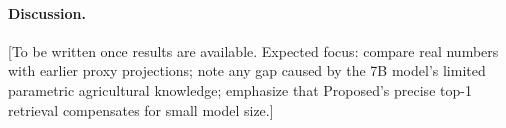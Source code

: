 \paragraph{Discussion.} [To be written once results are available. Expected focus: compare real numbers with earlier proxy projections; note any gap caused by the 7B model's limited parametric agricultural knowledge; emphasize that Proposed's precise top-1 retrieval compensates for small model size.]
